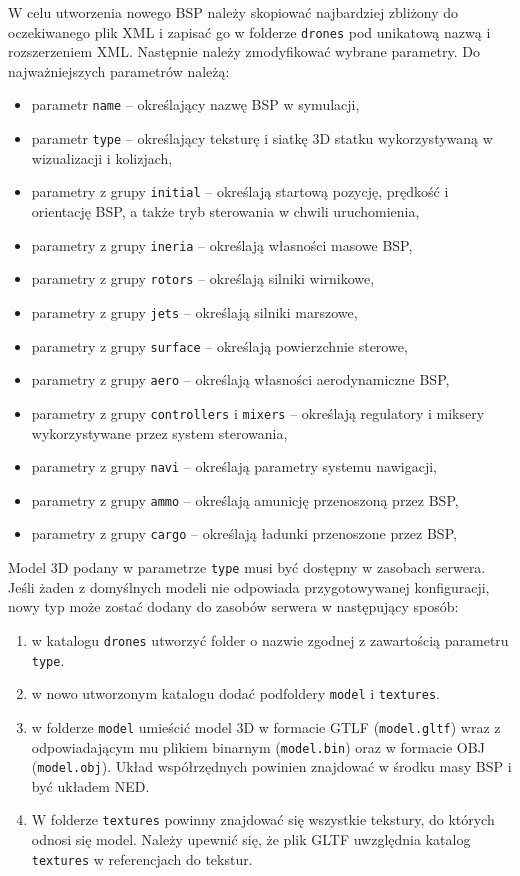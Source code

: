 W celu utworzenia nowego BSP należy skopiować najbardziej zbliżony do oczekiwanego plik XML i zapisać go w folderze \texttt{drones} pod unikatową nazwą i rozszerzeniem XML. Następnie należy zmodyfikować wybrane parametry. Do najważniejszych parametrów należą:

 \begin{itemize}[noitemsep]
\item parametr \texttt{name} -- określający nazwę BSP w symulacji,
\item parametr \texttt{type} -- określający teksturę i siatkę 3D statku wykorzystywaną w wizualizacji i kolizjach,
\item parametry z grupy \texttt{initial} -- określają startową pozycję, prędkość i orientację BSP, a także tryb sterowania w chwili uruchomienia,
\item parametry z grupy \texttt{ineria} -- określają własności masowe BSP,
\item parametry z grupy \texttt{rotors} -- określają silniki wirnikowe,
\item parametry z grupy \texttt{jets} -- określają silniki marszowe,
\item parametry z grupy \texttt{surface} -- określają powierzchnie sterowe,
\item parametry z grupy \texttt{aero} -- określają własności aerodynamiczne BSP,
\item parametry z grupy \texttt{controllers} i \texttt{mixers} -- określają regulatory i miksery wykorzystywane przez system sterowania,
\item parametry z grupy \texttt{navi} -- określają parametry systemu nawigacji,
\item parametry z grupy \texttt{ammo} -- określają amunicję przenoszoną przez BSP,
\item parametry z grupy \texttt{cargo} -- określają ładunki przenoszone przez BSP,
\end{itemize}

Model 3D podany w parametrze \texttt{type} musi być dostępny w zasobach serwera. Jeśli żaden z domyślnych modeli nie odpowiada przygotowywanej konfiguracji, nowy typ może zostać dodany do zasobów serwera w następujący sposób:

\begin{enumerate}
	\item w katalogu \texttt{drones} utworzyć folder o nazwie zgodnej z zawartością parametru \texttt{type}.
	\item w nowo utworzonym katalogu dodać podfoldery \texttt{model} i \texttt{textures}.
	\item w folderze \texttt{model} umieścić model 3D w formacie GTLF (\texttt{model.gltf}) wraz z odpowiadającym mu plikiem binarnym (\texttt{model.bin}) oraz w formacie OBJ (\texttt{model.obj}). Układ współrzędnych powinien znajdować w środku masy BSP i być układem NED.
	\item W folderze \texttt{textures} powinny znajdować się wszystkie tekstury, do których odnosi się model. Należy upewnić się, że plik GLTF uwzględnia katalog \texttt{textures} w referencjach do tekstur.
\end{enumerate}

